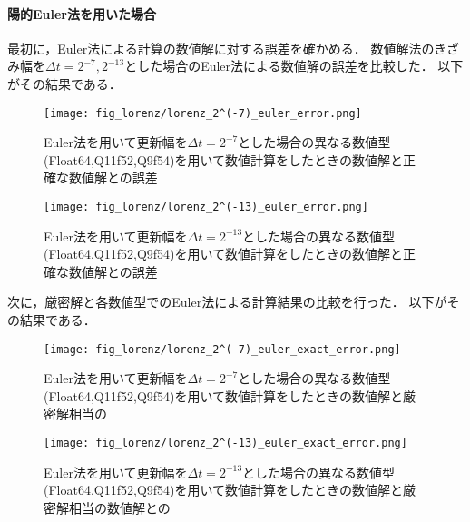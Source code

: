 \paragraph*{陽的Euler法を用いた場合}
最初に，Euler法による計算の数値解に対する誤差を確かめる．
数値解法のきざみ幅を$\Delta t = 2^{-7},2^{-13}$とした場合のEuler法による数値解の誤差を比較した．
以下がその結果である．
\begin{figure}[H]
    \centering
    \begin{minipage}[b]{0.49\columnwidth}
        \centering
        \texttt{[image: fig\_lorenz/lorenz\_2^(-7)\_euler\_error.png]}
        \caption{Euler法を用いて更新幅を$\Delta t = 2^{-7}$とした場合の異なる数値型(Float64,Q11f52,Q9f54)を用いて数値計算をしたときの数値解と正確な数値解との誤差}
        \label{fig:lorenz_2^(-7)_euler_error}
    \end{minipage}
    \begin{minipage}[b]{0.49\columnwidth}
        \centering
        \texttt{[image: fig\_lorenz/lorenz\_2^(-13)\_euler\_error.png]}
        \caption{Euler法を用いて更新幅を$\Delta t =  2^{-13}$とした場合の異なる数値型(Float64,Q11f52,Q9f54)を用いて数値計算をしたときの数値解と正確な数値解との誤差}
        \label{fig:lorenz_2^(-13)_euler_error}
    \end{minipage}
\end{figure}
次に，厳密解と各数値型でのEuler法による計算結果の比較を行った．
以下がその結果である．
\begin{figure}[H]
    \centering
    \begin{minipage}[b]{0.49\columnwidth}
        \centering
        \texttt{[image: fig\_lorenz/lorenz\_2^(-7)\_euler\_exact\_error.png]}
        \caption{Euler法を用いて更新幅を$\Delta t = 2^{-7}$とした場合の異なる数値型(Float64,Q11f52,Q9f54)を用いて数値計算をしたときの数値解と厳密解相当の}
        \label{fig:lorenz_2^(-7)_euler_exact_error}
    \end{minipage}
    \begin{minipage}[b]{0.49\columnwidth}
        \centering
        \texttt{[image: fig\_lorenz/lorenz\_2^(-13)\_euler\_exact\_error.png]}
        \caption{Euler法を用いて更新幅を$\Delta t =  2^{-13}$とした場合の異なる数値型(Float64,Q11f52,Q9f54)を用いて数値計算をしたときの数値解と厳密解相当の数値解との}
        \label{fig:lorenz_2^(-13)_euler_exact_error}
    \end{minipage}
\end{figure}

